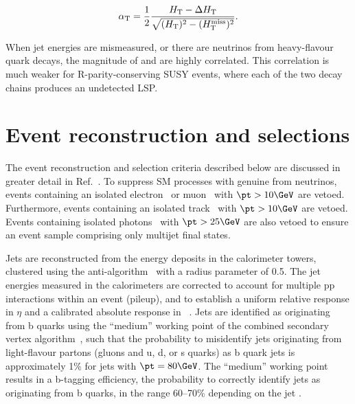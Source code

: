 \begin{equation}
  \label{eq:alphat}
  \alpha_\mathrm{T} = \frac{1}{2} \frac{H_\text{T} -
    \Delta H_\text{T}}{\sqrt{(H_\text{T})^2 - (H_\text{T}^\text{miss})^2}}.
\end{equation}

When jet energies are mismeasured, or there are neutrinos from
heavy-flavour quark decays, the magnitude of \HTmiss and \dht are
highly correlated. This correlation is much weaker for
R-parity-conserving SUSY events, where each of the two decay chains
produces an undetected LSP.


\section{Event reconstruction and selections}
\label{sec:selections}

The event reconstruction and selection criteria described below are
discussed in greater detail in Ref.~\cite{RA1Paper2012}. To suppress
SM processes with genuine \ptvecmiss from neutrinos, events
containing an isolated electron~\cite{Khachatryan:2015hwa} or
muon~\cite{Chatrchyan:2012xi} with $\pt > 10\GeV$ are
vetoed. Furthermore, events containing an isolated
track~\cite{single-lepton-stop} with $\pt > 10\GeV$ are vetoed. Events
containing isolated photons~\cite{Khachatryan:2015iwa} with $\pt >
25\GeV$ are also vetoed to ensure an event sample comprising only
multijet final states.

Jets are reconstructed from the energy deposits in the calorimeter
towers, clustered using the anti-\kt algorithm~\cite{antikt} with a
radius parameter of 0.5. The jet energies measured in the
calorimeters are corrected to account for multiple pp interactions
within an event (pileup), and to establish a uniform relative response
in $\eta$ and a calibrated absolute response in
\pt~\cite{Chatrchyan:2011ds}.  Jets are identified as originating from
b quarks using the ``medium'' working point of the combined secondary
vertex algorithm~\cite{Chatrchyan:2012jua}, such that the probability
to misidentify jets originating from light-flavour partons (gluons and
u, d, or s quarks) as b quark jets is approximately 1\% for jets with
$\pt = 80\GeV$. The ``medium'' working point results in a b-tagging
efficiency, \ie the probability to correctly identify jets as
originating from b quarks, in the range 60--70\% depending on the jet
\pt.

